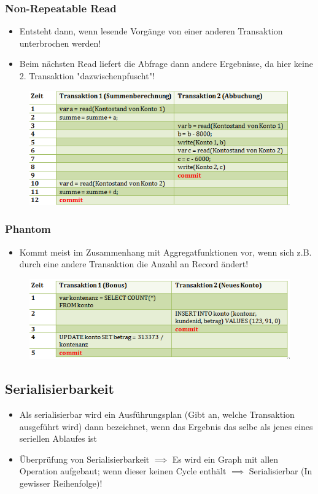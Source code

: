 \subsubsection{Non-Repeatable Read}
\begin{itemize}
    \item Entsteht dann, wenn lesende Vorgänge von einer anderen Transaktion unterbrochen werden!
    \item Beim nächsten Read liefert die Abfrage dann andere Ergebnisse, da hier keine 2. Transaktion "dazwischenpfuscht"!
\end{itemize}
\begin{figure}[H]
    \centering
    \includegraphics{res/themenkorb_5/nonrepeatableread.png}
\end{figure}
\subsubsection{Phantom}
\begin{itemize}
    \item Kommt meist im Zusammenhang mit Aggregatfunktionen vor, wenn sich z.B. durch eine andere Transaktion die Anzahl an Record ändert!
\end{itemize}
\begin{figure}[H]
    \centering
    \includegraphics{res/themenkorb_5/phantom.png}
\end{figure}

\subsection{Serialisierbarkeit}
\begin{itemize}
    \item Als serialisierbar wird ein Ausführungsplan (Gibt an, welche Transaktion ausgeführt wird) dann bezeichnet, wenn das Ergebnis das selbe als jenes eines seriellen Ablaufes ist
    \item Überprüfung von Serialisierbarkeit $\implies$ Es wird ein Graph mit allen Operation aufgebaut; wenn dieser keinen Cycle enthält $\implies$ Serialisierbar (In gewisser Reihenfolge)!
\end{itemize}


